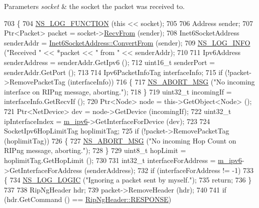 \begin{DoxyParams}{Parameters}
{\em socket} & the socket the packet was received to. \\
\hline
\end{DoxyParams}

\begin{DoxyCode}
703 \{
704   \hyperlink{log-macros-disabled_8h_a90b90d5bad1f39cb1b64923ea94c0761}{NS\_LOG\_FUNCTION} (\textcolor{keyword}{this} << socket);
705 
706   Address sender;
707   Ptr<Packet> packet = socket->\hyperlink{classns3_1_1Socket_af22378d7af9a2745a9eada20210da215}{RecvFrom} (sender);
708   Inet6SocketAddress senderAddr = \hyperlink{classns3_1_1Inet6SocketAddress_a2177c66e1bcf17c85dcffb9d2a971f5a}{Inet6SocketAddress::ConvertFrom} (sender);
709   \hyperlink{group__logging_gafbd73ee2cf9f26b319f49086d8e860fb}{NS\_LOG\_INFO} (\textcolor{stringliteral}{"Received "} << *packet << \textcolor{stringliteral}{" from "} << senderAddr);
710 
711   Ipv6Address senderAddress = senderAddr.GetIpv6 ();
712   uint16\_t senderPort = senderAddr.GetPort ();
713 
714   Ipv6PacketInfoTag interfaceInfo;
715   \textcolor{keywordflow}{if} (!packet->RemovePacketTag (interfaceInfo))
716     \{
717       \hyperlink{group__fatal_ga51ac4699be799d772ae7258d1ef6af21}{NS\_ABORT\_MSG} (\textcolor{stringliteral}{"No incoming interface on RIPng message, aborting."});
718     \}
719   uint32\_t incomingIf = interfaceInfo.GetRecvIf ();
720   Ptr<Node> node = this->GetObject<Node> ();
721   Ptr<NetDevice> dev = node->GetDevice (incomingIf);
722   uint32\_t ipInterfaceIndex = \hyperlink{classns3_1_1RipNg_aca7a023799ce2004499a826ba5d5d3fe}{m\_ipv6}->GetInterfaceForDevice (dev);
723 
724   SocketIpv6HopLimitTag hoplimitTag;
725   \textcolor{keywordflow}{if} (!packet->RemovePacketTag (hoplimitTag))
726     \{
727       \hyperlink{group__fatal_ga51ac4699be799d772ae7258d1ef6af21}{NS\_ABORT\_MSG} (\textcolor{stringliteral}{"No incoming Hop Count on RIPng message, aborting."});
728     \}
729   uint8\_t hopLimit = hoplimitTag.GetHopLimit ();
730 
731   int32\_t interfaceForAddress = \hyperlink{classns3_1_1RipNg_aca7a023799ce2004499a826ba5d5d3fe}{m\_ipv6}->GetInterfaceForAddress (senderAddress);
732   \textcolor{keywordflow}{if} (interfaceForAddress != -1)
733     \{
734       \hyperlink{group__logging_ga88acd260151caf2db9c0fc84997f45ce}{NS\_LOG\_LOGIC} (\textcolor{stringliteral}{"Ignoring a packet sent by myself."});
735       \textcolor{keywordflow}{return};
736     \}
737 
738   RipNgHeader hdr;
739   packet->RemoveHeader (hdr);
740 
741   \textcolor{keywordflow}{if} (hdr.GetCommand () == \hyperlink{classns3_1_1RipNgHeader_ad96724d6f6fdb4ffa22fe71a0ff12bd2a787536902c0e1912fd0c234def4c32b7}{RipNgHeader::RESPONSE})

\end{DoxyCode}
